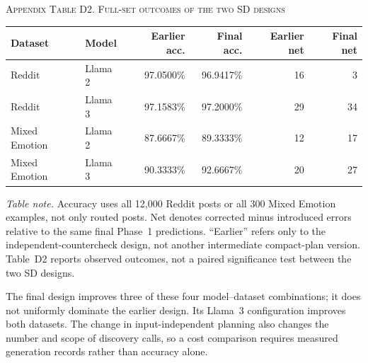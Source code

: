 \documentclass{ieeeaccess}
\begin{document}
\par\medskip\noindent\textsc{Appendix Table D2. Full-set outcomes of the two SD designs}\par\smallskip
{\small\renewcommand{\arraystretch}{1.18}\noindent\begin{tabular*}{\textwidth}{@{\extracolsep{\fill}}llrrrr@{}}\toprule
Dataset & Model & Earlier acc. & Final acc. & Earlier net & Final net \\\midrule
Reddit & Llama 2 & 97.0500\% & 96.9417\% & 16 & 3 \\
Reddit & Llama 3 & 97.1583\% & 97.2000\% & 29 & 34 \\
Mixed Emotion & Llama 2 & 87.6667\% & 89.3333\% & 12 & 17 \\
Mixed Emotion & Llama 3 & 90.3333\% & 92.6667\% & 20 & 27 \\\bottomrule
\end{tabular*}}\par\medskip
\noindent\textit{Table note.} Accuracy uses all 12,000 Reddit posts or all 300 Mixed Emotion examples, not only routed posts. Net denotes corrected minus introduced errors relative to the same final Phase~1 predictions. ``Earlier'' refers only to the independent-countercheck design, not another intermediate compact-plan version. Table~D2 reports observed outcomes, not a paired significance test between the two SD designs.

The final design improves three of these four model--dataset combinations; it does not uniformly dominate the earlier design. Its Llama~3 configuration improves both datasets. The change in input-independent planning also changes the number and scope of discovery calls, so a cost comparison requires measured generation records rather than accuracy alone.
\end{document}
